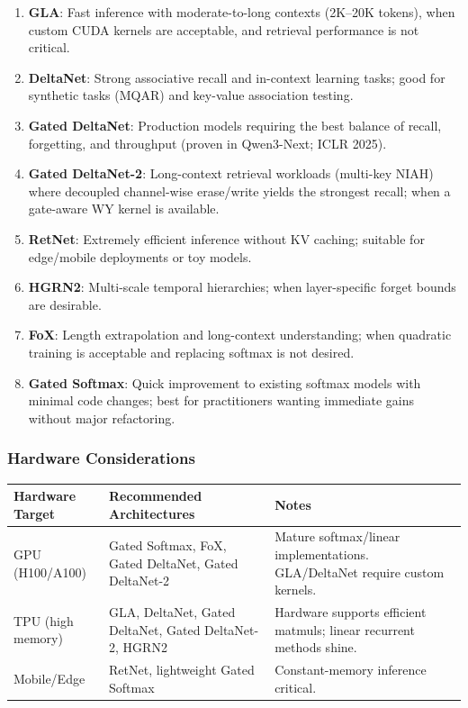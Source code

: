 \documentclass[11pt,a4paper]{article}
\begin{document}
\begin{enumerate}[leftmargin=*]
    \item \textbf{GLA}: Fast inference with moderate-to-long contexts (2K--20K tokens), when custom CUDA kernels are acceptable, and retrieval performance is not critical.
    \item \textbf{DeltaNet}: Strong associative recall and in-context learning tasks; good for synthetic tasks (MQAR) and key-value association testing.
    \item \textbf{Gated DeltaNet}: Production models requiring the best balance of recall, forgetting, and throughput (proven in Qwen3-Next; ICLR 2025).
    \item \textbf{Gated DeltaNet-2}: Long-context retrieval workloads (multi-key NIAH) where decoupled channel-wise erase/write yields the strongest recall; when a gate-aware WY kernel is available.
    \item \textbf{RetNet}: Extremely efficient inference without KV caching; suitable for edge/mobile deployments or toy models.
    \item \textbf{HGRN2}: Multi-scale temporal hierarchies; when layer-specific forget bounds are desirable.
    \item \textbf{FoX}: Length extrapolation and long-context understanding; when quadratic training is acceptable and replacing softmax is not desired.
    \item \textbf{Gated Softmax}: Quick improvement to existing softmax models with minimal code changes; best for practitioners wanting immediate gains without major refactoring.
\end{enumerate}

\subsubsection{Hardware Considerations}

\begin{table}[H]
\centering
\small
\begin{tabularx}{0.95\linewidth}{Xp{3.5cm}p{3.5cm}}
\toprule
\textbf{Hardware Target} & \textbf{Recommended Architectures} & \textbf{Notes} \\
\midrule
GPU (H100/A100) & Gated Softmax, FoX, Gated DeltaNet, Gated DeltaNet-2 & Mature softmax/linear implementations. GLA/DeltaNet require custom kernels. \\
TPU (high memory) & GLA, DeltaNet, Gated DeltaNet, Gated DeltaNet-2, HGRN2 & Hardware supports efficient matmuls; linear recurrent methods shine. \\
Mobile/Edge & RetNet, lightweight Gated Softmax & Constant-memory inference critical. \\
\bottomrule
\end{tabularx}
\end{table}
\end{document}
